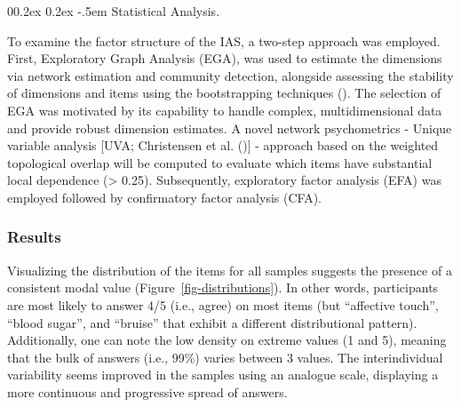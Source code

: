 \documentclass[
  man,
  floatsintext,
  longtable,
  nolmodern,
  notxfonts,
  notimes,
  colorlinks=true,linkcolor=blue,citecolor=blue,urlcolor=blue]{apa7}
\makeatletter
\renewcommand{\paragraph}{\@startsection{paragraph}{4}{\parindent}%
	{0\baselineskip \@plus 0.2ex \@minus 0.2ex}%
	{-.5em}%
	{\normalfont\normalsize\bfseries\typesectitle}}
\makeatother
\begin{document}
\paragraph{Statistical Analysis.}\label{statistical-analysis}

To examine the factor structure of the IAS, a two-step approach was
employed. First, Exploratory Graph Analysis (EGA), was used to estimate
the dimensions via network estimation and community detection, alongside
assessing the stability of dimensions and items using the bootstrapping
techniques (). The selection of EGA was motivated by its capability to handle
complex, multidimensional data and provide robust dimension estimates. A
novel network psychometrics - Unique variable analysis {[}UVA;
Christensen et al. (){]} -
approach based on the weighted topological overlap will be computed to
evaluate which items have substantial local dependence (\textgreater{}
0.25). Subsequently, exploratory factor analysis (EFA) was employed
followed by confirmatory factor analysis (CFA).

\subsubsection{Results}\label{results}

Visualizing the distribution of the items for all samples suggests the
presence of a consistent modal value (Figure~\ref{fig-distributions}).
In other words, participants are most likely to answer 4/5 (i.e., agree)
on most items (but ``affective touch'', ``blood sugar'', and ``bruise''
that exhibit a different distributional pattern). Additionally, one can
note the low density on extreme values (1 and 5), meaning that the bulk
of answers (i.e., 99\%) varies between 3 values. The interindividual
variability seems improved in the samples using an analogue scale,
displaying a more continuous and progressive spread of answers.
\end{document}
